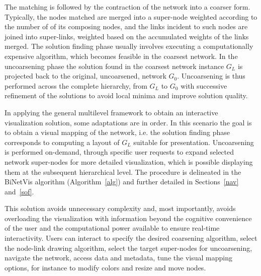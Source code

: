 \documentclass[runningheads]{llncs}
\begin{document}
\noindent The matching is followed by the contraction of the network into a coarser form.
Typically, the nodes matched are merged into a super-node weighted according to the number of of its composing nodes, and the links incident to such nodes are joined into super-links,
weighted based on the accumulated weights of the links merged.
The solution finding phase usually involves executing a computationally expensive algorithm, which becomes feasible in the coarsest network. In the uncoarsening phase the solution found in the coarsest network instance $G_L$ is projected back to the original, uncoarsened, network $G_0$. Uncoarsening is thus performed across the complete hierarchy, from $G_L$ to $G_0$ with successive refinement of the solutions to avoid local minima and improve solution quality.

In applying the general multilevel framework to obtain an interactive visualization solution, some adaptations are in order.  
In this scenario the goal is to obtain a visual mapping of the network, i.e. the solution finding phase corresponds to computing a layout of $G_L$ suitable for presentation.  Uncoarsening is performed  on-demand, through specific user requests
to expand selected network super-nodes for more detailed visualization, which is possible displaying them at the subsequent hierarchical level. The procedure is delineated in the BiNetVis algorithm (Algorithm~\ref{alg}) and further detailed in Sections~\ref{nav} and~\ref{sof}.

This solution avoids unnecessary complexity and, most importantly, avoids overloading the visualization with information beyond the cognitive convenience of the user and the computational power available to ensure real-time interactivity.
Users can interact to specify the desired coarsening algorithm, select the node-link drawing algorithm, select the target super-nodes for uncoarsening, navigate the network, access data and metadata, tune the visual mapping options, for instance to modify colors and resize and move nodes. 
\end{document}
